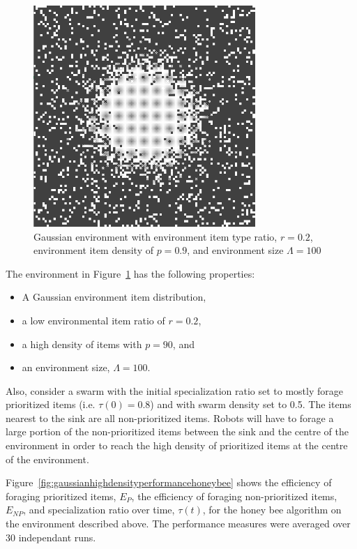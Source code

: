 \documentclass[preprint,12pt]{elsarticle}
\begin{document}
\begin{figure}
    \centering
    \includegraphics[width=0.75\textwidth]{figures/flexibility-gaussian-obj90-ratio.PNG}
    \caption{Gaussian environment with environment item type ratio, $r=0.2$, environment item density of $p=0.9$, and environment size $\Lambda=100$}
    \label{fig:gaussianhighdensityenv}
\end{figure}
    

The environment in Figure~\ref{fig:gaussianhighdensityenv} has the following properties:

\begin{itemize}
\item A Gaussian environment item distribution,
\item a low environmental item ratio of $r=0.2$,
\item a high density of items with $p=90$, and
\item an environment size, $\Lambda=100$.
\end{itemize}


Also, consider a swarm with the initial specialization ratio set to mostly forage prioritized items (i.e. $\tau(0)=0.8$) and with swarm density set to 0.5. The items nearest to the sink are all non-prioritized items. Robots will have to forage a large portion of the non-prioritized items between the sink and the centre of the environment in order to reach the high density of prioritized items at the centre of the environment. 


Figure~\ref{fig:gaussianhighdensityperformancehoneybee} shows the efficiency of foraging prioritized items, $E_P$, the efficiency of foraging non-prioritized items, $E_{NP}$, and specialization ratio over time, $\tau(t)$, for the honey bee algorithm on the environment described above. The performance measures were averaged over 30 independant runs.
\end{document}
